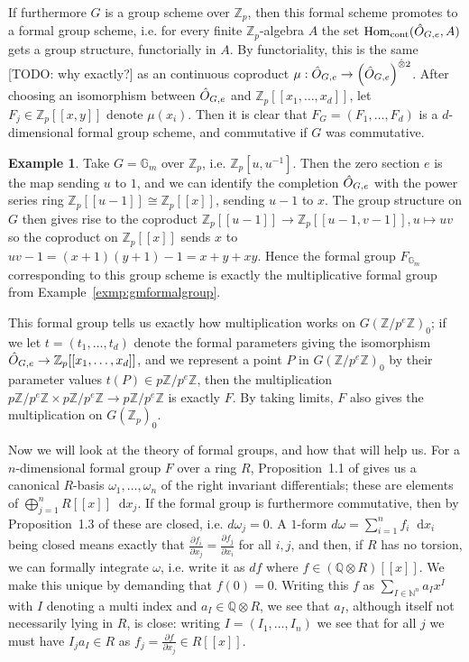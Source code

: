 \documentclass{article}
\newcommand{\N}{\mathbb{N}}
\newcommand{\Z}{\mathbb{Z}}
\renewcommand{\G}{\mathbb{G}}
\newcommand{\Q}{\mathbb{Q}}
\newcommand*\diff{\mathop{}\!\mathrm{d}}
\newcommand{\tensor}{\otimes}
\DeclareMathOperator{\Hom}{Hom}
\theoremstyle{plain}
\theoremstyle{definition}
\newtheorem{exmp}[thm]{Example} %
\theoremstyle{remark}
\begin{document}
If furthermore $G$ is a group scheme over $\Z_p$, then this formal scheme promotes to a formal group scheme, i.e. for every finite $\Z_p$-algebra $A$ the set $\Hom_{\text{cont}}(\Hat{O}_{G,e},A)$ gets a group structure, functorially in $A$. By functoriality, this is the same [TODO: why exactly?] as an continuous coproduct $\mu: \Hat{O}_{G,e} \to \left(\Hat{O}_{G,e}\right)^{\Hat{\tensor} 2}$. After choosing an isomorphism between $\Hat{O}_{G,e}$ and $\Z_p[[x_1,\dots,x_d]]$, let $F_j \in \Z_p[[x,y]]$ denote $\mu(x_i)$. Then it is clear that $F_G = (F_1,\dots,F_d)$ is a $d$-dimensional formal group scheme, and commutative if $G$ was commutative.
\begin{exmp}
\label{exmp:gmtoformal} %
Take $G = \G_m$ over $\Z_p$, i.e. $\Z_p[u,u^{-1}]$. Then the zero section $e$ is the map sending $u$ to $1$, and we can identify the completion $\Hat{O}_{G,e}$ with the power series ring $\Z_p[[u-1]] \cong \Z_p[[x]]$, sending $u-1$ to $x$. The group structure on $G$ then gives rise to the coproduct $\Z_p[[u-1]] \to \Z_p[[u-1,v-1]], u \mapsto uv$ so the coproduct on $\Z_p[[x]]$ sends $x$ to $uv-1 = (x+1)(y+1) -1 = x + y + xy$. Hence the formal group $F_{\G_m}$ corresponding to this group scheme is exactly the multiplicative formal group from Example~\ref{exmp:gmformalgroup}.
\end{exmp}

This formal group tells us exactly how multiplication works on $G(\Z/p^e\Z)_0$; if we let $t = (t_1,\dots,t_d)$ denote the formal parameters giving the isomorphism $\Hat{O}_{G,e} \to \Z_p[[x_1,\dots,x_d]]$, and we represent a point $P$ in $G(\Z/p^e\Z)_0$ by their parameter values $t(P) \in p\Z/p^e\Z$, then the multiplication $p\Z/p^e\Z \times p\Z/p^e\Z \to p\Z/p^e\Z$ is exactly $F$. By taking limits, $F$ also gives the multiplication on $G(\Z_p)_0$.

Now we will look at the theory of formal groups, and how that will help us. For a $n$-dimensional formal group $F$ over a ring $R$, Proposition~1.1 of \citep{honda70} gives us a canonical $R$-basis $\omega_1,\dots,\omega_n$ of the right invariant differentials; these are elements of $\bigoplus_{j=1}^n R[[x]] \diff x_j$. If the formal group is furthermore commutative, then by Proposition~1.3 of \citep{honda70} these are closed, i.e. $d\omega_j = 0$. A $1$-form $d\omega = \sum_{i=1}^n f_i \diff x_i$ being closed means exactly that $\frac{\partial f_i}{\partial x_j} = \frac{\partial f_j}{\partial x_i}$ for all $i,j$, and then, if $R$ has no torsion, we can formally integrate $\omega$, i.e. write it as $df$ where $f \in (\Q\tensor R)[[x]]$. We make this unique by demanding that $f(0) = 0$. Writing this $f$ as $\sum_{I \in \N^n} a_I x^I$ with $I$ denoting a multi index and $a_I \in \Q\tensor R$, we see that $a_I$, although itself not necessarily lying in $R$, is close: writing $I = (I_1,\dots,I_n)$ we see that for all $j$ we must have $I_j a_I \in R$ as $f_j = \frac{\partial f}{\partial x_j} \in R[[x]]$.
\end{document}
